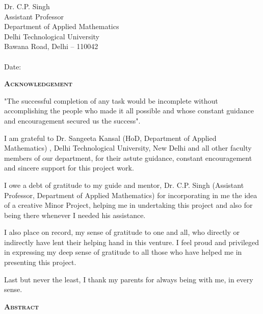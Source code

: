 \documentclass[12pt]{article}
\begin{document}
	\begin{flushright}
		Dr. C.P. Singh\\Assistant Professor\\Department of Applied Mathematics\\Delhi Technological University\\Bawana Road, Delhi – 110042\\~\\Date: \underline{\hspace{3cm}}
	\end{flushright}
	\pagebreak
	\begin{center}
		\textsc{\large \textbf{Acknowledgement}}\\[1.5cm]
	\end{center}
	\begin{justify}
		\textnormal{"The successful completion of any task would be incomplete without accomplishing the people who made it all possible and whose constant guidance and encouragement secured us the success".}
	\end{justify}
	\begin{justify}
		\textnormal{I am grateful to Dr. Sangeeta Kansal (HoD, Department of Applied Mathematics) , Delhi Technological University, New Delhi and all other faculty members of our department, for their astute guidance, constant encouragement and sincere support for this project work.}
	\end{justify}
	\begin{justify}
		\textnormal{I owe a debt of gratitude to my guide and mentor, Dr. C.P. Singh (Assistant Professor, Department of Applied Mathematics) for incorporating in me the idea of a creative Minor Project, helping me in undertaking this project and also for being there whenever I needed his assistance.}
	\end{justify}
	\begin{justify}
		\textnormal{I also place on record, my sense of gratitude to one and all, who directly or indirectly have lent their helping hand in this venture. I feel proud and privileged in expressing my deep sense of gratitude to all those who have helped me in presenting this project.}
	\end{justify}
	\begin{justify}
		Last but never the least, I thank my parents for always being with me, in every sense.
	\end{justify}
	\pagebreak
	\begin{center}
		\textsc{\large \textbf{Abstract}}\\[1.5cm]
	\end{center}
\end{document}
